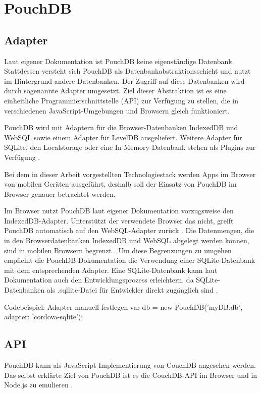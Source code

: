 \chapter{PouchDB}
\label{PouchDB}

\section{Adapter}
\label{Adapter}

Laut eigener Dokumentation ist PouchDB keine eigenständige Datenbank. Stattdessen versteht sich PouchDB als Datenbankabstraktionsschicht und nutzt im Hintergrund andere Datenbanken. Der Zugriff auf diese Datenbanken wird durch sogenannte Adapter umgesetzt. Ziel dieser Abstraktion ist es eine einheitliche Programmierschnittstelle (API) zur Verfügung zu stellen, die in verschiedenen JavaScript-Umgebungen und Browsern gleich funktioniert.

PouchDB wird mit Adaptern für die Browser-Datenbanken IndexedDB und WebSQL sowie einem Adapter für LevelDB ausgeliefert. Weitere Adapter für SQLite, den Localstorage oder eine In-Memory-Datenbank stehen als Plugins zur Verfügung \cite{pouch:adapters}.


Bei dem in dieser Arbeit vorgestellten Technologiestack werden Apps im Browser von mobilen Geräten ausgeführt, deshalb soll der Einsatz von PouchDB im Browser genauer betrachtet werden.

Im Browser nutzt PouchDB laut eigener Dokumentation vorzugsweise den IndexedDB-Adapter. Unterstützt der verwendete Browser das nicht, greift PouchDB automatisch auf den WebSQL-Adapter zurück \cite{pouch:adapters}. Die Datenmengen, die in den Browserdatenbanken IndexedDB und WebSQL abgelegt werden können, sind in mobilen Browsern begrenzt \cite{html5:quota}. Um diese Begrenzungen zu umgehen empfiehlt die PouchDB-Dokumentation die Verwendung einer SQLite-Datenbank mit dem entsprechenden Adapter. Eine SQLite-Datenbank kann laut Dokumentation auch den Entwicklungsprozess erleichtern, da SQLite-Datenbanken als .sqllite-Datei für Entwickler direkt zugänglich sind  \cite{pouch:adapters}.


Codebeispiel: Adapter manuell festlegen
var db = new PouchDB('myDB.db', {adapter: 'cordova-sqlite'});


\section{API}
\label{API}
PouchDB kann als JavaScript-Implementierung von CouchDB angesehen werden. Das selbst erklärte Ziel von PouchDB ist es die CouchDB-API im Browser und in Node.js zu emulieren \cite{pouch:intro}. 

